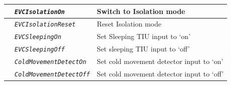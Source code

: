 \begin{itemize}
\begin{longtable}{|l|l|l|}
			\hline

			&	\begin{minipage}[t]{0.30\linewidth} \emph{\texttt{EVCIsolationOn}} \end{minipage}
			&	\begin{minipage}[t]{0.38\linewidth} Switch to Isolation mode \end{minipage} \\

			\hline

			&	\begin{minipage}[t]{0.30\linewidth} \emph{\texttt{EVCIsolationReset}} \end{minipage}
			&	\begin{minipage}[t]{0.38\linewidth}Reset Isolation mode \end{minipage} \\

			\hline

			&	\begin{minipage}[t]{0.30\linewidth} \emph{\texttt{EVCSleepingOn}} \end{minipage}
			&	\begin{minipage}[t]{0.38\linewidth} Set Sleeping TIU input to ‘on’ \end{minipage} \\

			\hline

			&	\begin{minipage}[t]{0.30\linewidth} \emph{\texttt{EVCSleepingOff}} \end{minipage}
			&	\begin{minipage}[t]{0.38\linewidth} Set sleeping TIU input to ‘off’\end{minipage} \\

			\hline

			&	\begin{minipage}[t]{0.30\linewidth} \emph{\texttt{ColdMovementDetectOn}} \end{minipage}
			&	\begin{minipage}[t]{0.38\linewidth} Set cold movement detector input to ‘on’ \end{minipage} \\

			\hline

			&	\begin{minipage}[t]{0.30\linewidth} \emph{\texttt{ColdMovementDetectOff}} \end{minipage}
			&	\begin{minipage}[t]{0.38\linewidth} Set cold movement detector input to ‘off’ \end{minipage} \\


\end{longtable}
\end{itemize}
